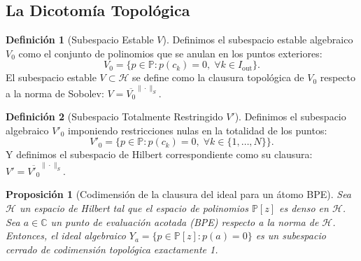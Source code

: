\documentclass[12pt,a4paper]{article}
\newtheorem{proposition}{Proposición}
\theoremstyle{definition}
\newtheorem{definition}{Definición}
\theoremstyle{remark}
\newcommand{\Poly}{\mathbb{P}[z]}
\begin{document}
\subsection{La Dicotomía Topológica}

\begin{definition}[Subespacio Estable $V$]
  Definimos el subespacio estable algebraico $V_0$ como el conjunto de polinomios que se anulan en los puntos exteriores:
  \begin{equation}
    V_0 = \{p \in \mathbb{P} : p(c_k) = 0, \; \forall k \in I_{\mathrm{out}}\}.
  \end{equation}
  El subespacio estable $V \subset \mathcal{H}$ se define como la clausura topológica de $V_0$ respecto a la norma de Sobolev: $V = \overline{V_0}^{\|\cdot\|_S}$.
\end{definition}

\begin{definition}[Subespacio Totalmente Restringido $V'$]
  Definimos el subespacio algebraico $V'_0$ imponiendo restricciones nulas en la totalidad de los puntos:
  \begin{equation}
    V'_0 = \{p \in \mathbb{P} : p(c_k) = 0, \; \forall k \in \{1, \dots, N\}\}.
  \end{equation}
  Y definimos el subespacio de Hilbert correspondiente como su clausura: $V' = \overline{V'_0}^{\|\cdot\|_S}$.
\end{definition}

\begin{proposition}[Codimensión de la clausura del ideal para un átomo BPE]
  Sea $\mathcal{H}$ un espacio de Hilbert tal que el espacio de polinomios $\Poly$ es denso en $\mathcal{H}$. Sea $a \in \mathbb{C}$ un punto de evaluación acotada (BPE) respecto a la norma de $\mathcal{H}$. Entonces, el ideal algebraico $Y_a = \{p \in \Poly : p(a) = 0\}$ es un subespacio cerrado de codimensión topológica exactamente 1.
\end{proposition}
\end{document}
